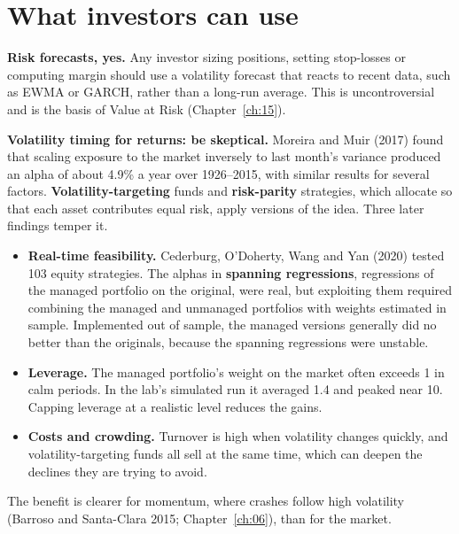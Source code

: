 \section{What investors can use}
\label{sec:14-investors}

\textbf{Risk forecasts, yes.} Any investor sizing positions, setting stop-losses or computing margin should use a volatility forecast that reacts to recent data, such as EWMA or GARCH, rather than a long-run average. This is uncontroversial and is the basis of Value at Risk (Chapter~\ref{ch:15}).

\textbf{Volatility timing for returns: be skeptical.} Moreira and Muir (2017) found that scaling exposure to the market inversely to last month's variance produced an alpha of about 4.9\% a year over 1926--2015, with similar results for several factors. \textbf{Volatility-targeting} funds and \textbf{risk-parity} strategies, which allocate so that each asset contributes equal risk, apply versions of the idea. Three later findings temper it.

\begin{itemize}
  \item \textbf{Real-time feasibility.} Cederburg, O'Doherty, Wang and Yan (2020) tested 103 equity strategies. The alphas in \textbf{spanning regressions}, regressions of the managed portfolio on the original, were real, but exploiting them required combining the managed and unmanaged portfolios with weights estimated in sample. Implemented out of sample, the managed versions generally did no better than the originals, because the spanning regressions were unstable.
  \item \textbf{Leverage.} The managed portfolio's weight on the market often exceeds 1 in calm periods. In the lab's simulated run it averaged 1.4 and peaked near 10. Capping leverage at a realistic level reduces the gains.
  \item \textbf{Costs and crowding.} Turnover is high when volatility changes quickly, and volatility-targeting funds all sell at the same time, which can deepen the declines they are trying to avoid.
\end{itemize}

The benefit is clearer for momentum, where crashes follow high volatility (Barroso and Santa-Clara 2015; Chapter~\ref{ch:06}), than for the market.

